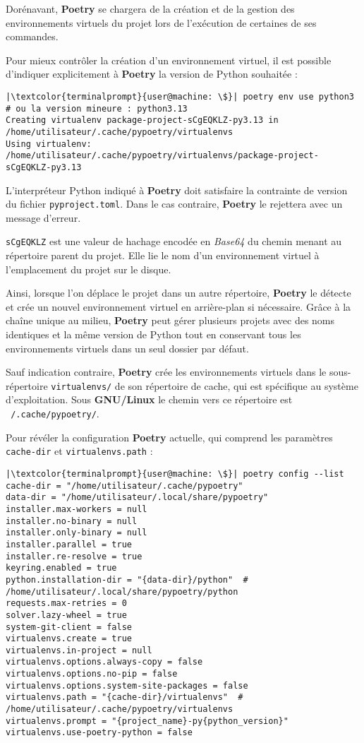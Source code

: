 Dorénavant, \textbf{Poetry} se chargera de la création et de la gestion des environnements virtuels du projet lors de l'exécution de certaines de ses commandes.

Pour mieux contrôler la création d'un environnement virtuel, il est possible d'indiquer explicitement à \textbf{Poetry} la version de Python souhaitée :
\begin{lstlisting}[style=terminal]
|\textcolor{terminalprompt}{user@machine: \$}| poetry env use python3  # ou la version mineure : python3.13
Creating virtualenv package-project-sCgEQKLZ-py3.13 in /home/utilisateur/.cache/pypoetry/virtualenvs
Using virtualenv: /home/utilisateur/.cache/pypoetry/virtualenvs/package-project-sCgEQKLZ-py3.13
\end{lstlisting}

L'interpréteur Python indiqué à \textbf{Poetry} doit satisfaire la contrainte de version du fichier \texttt{pyproject.toml}. Dans le cas contraire, \textbf{Poetry} le rejettera avec un message d'erreur.

\texttt{sCgEQKLZ} est une valeur de hachage encodée en \textit{Base64} du chemin menant au répertoire parent du projet. Elle lie le nom d'un environnement virtuel à l'emplacement du projet sur le disque.

Ainsi, lorsque l'on déplace le projet dans un autre répertoire, \textbf{Poetry} le détecte et crée un nouvel environnement virtuel en arrière-plan si nécessaire. Grâce à la chaîne unique au milieu, \textbf{Poetry} peut gérer plusieurs projets avec des noms identiques et la même version de Python tout en conservant tous les environnements virtuels dans un seul dossier par défaut.

Sauf indication contraire, \textbf{Poetry} crée les environnements virtuels dans le sous-répertoire \texttt{virtualenvs/} de son répertoire de cache, qui est spécifique au système d'exploitation. Sous \textbf{GNU/Linux} le chemin vers ce répertoire est \texttt{~/.cache/pypoetry/}.

Pour révéler la configuration \textbf{Poetry} actuelle, qui comprend les paramètres \texttt{cache-dir} et \texttt{virtualenvs.path} :
\begin{lstlisting}[style=terminal]
|\textcolor{terminalprompt}{user@machine: \$}| poetry config --list
cache-dir = "/home/utilisateur/.cache/pypoetry"
data-dir = "/home/utilisateur/.local/share/pypoetry"
installer.max-workers = null
installer.no-binary = null
installer.only-binary = null
installer.parallel = true
installer.re-resolve = true
keyring.enabled = true
python.installation-dir = "{data-dir}/python"  # /home/utilisateur/.local/share/pypoetry/python
requests.max-retries = 0
solver.lazy-wheel = true
system-git-client = false
virtualenvs.create = true
virtualenvs.in-project = null
virtualenvs.options.always-copy = false
virtualenvs.options.no-pip = false
virtualenvs.options.system-site-packages = false
virtualenvs.path = "{cache-dir}/virtualenvs"  # /home/utilisateur/.cache/pypoetry/virtualenvs
virtualenvs.prompt = "{project_name}-py{python_version}"
virtualenvs.use-poetry-python = false
\end{lstlisting}

